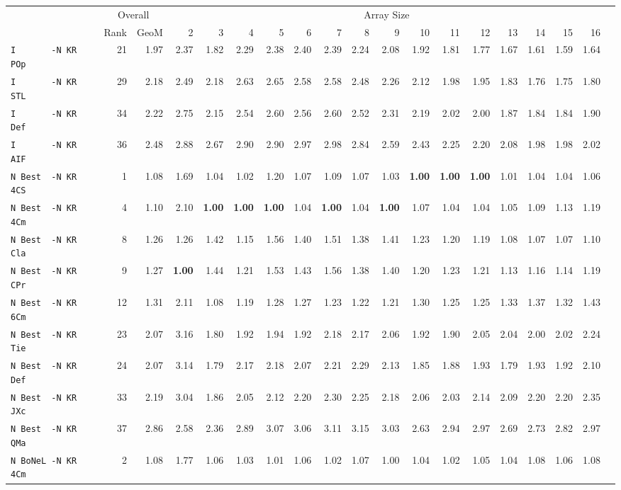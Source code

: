 \begin{tabular}{l | r @{~~} r | r@{~~}r@{~~}r@{~~}r@{~~}r@{~~}r@{~~}r@{~~}r@{~~}r@{~~}r@{~~}r@{~~}r@{~~}r@{~~}r@{~~}r@{~~}r|}
 & \multicolumn{2}{c|}{Overall} & \multicolumn{15}{c}{Array Size} \\
 & Rank & GeoM & 2&3&4&5&6&7&8&9&10&11&12&13&14&15&16\\ \hline
\verb+I       -N KR POp+ & 21 & 1.97 & 2.37&1.82&2.29&2.38&2.40&2.39&2.24&2.08&1.92&1.81&1.77&1.67&1.61&1.59&1.64\\
\verb+I       -N KR STL+ & 29 & 2.18 & 2.49&2.18&2.63&2.65&2.58&2.58&2.48&2.26&2.12&1.98&1.95&1.83&1.76&1.75&1.80\\
\verb+I       -N KR Def+ & 34 & 2.22 & 2.75&2.15&2.54&2.60&2.56&2.60&2.52&2.31&2.19&2.02&2.00&1.87&1.84&1.84&1.90\\
\verb+I       -N KR AIF+ & 36 & 2.48 & 2.88&2.67&2.90&2.90&2.97&2.98&2.84&2.59&2.43&2.25&2.20&2.08&1.98&1.98&2.02\smallskip \\
\verb+N Best  -N KR 4CS+ & 1 & 1.08 & 1.69&1.04&1.02&1.20&1.07&1.09&1.07&1.03&\textbf{1.00}&\textbf{1.00}&\textbf{1.00}&1.01&1.04&1.04&1.06\\
\verb+N Best  -N KR 4Cm+ & 4 & 1.10 & 2.10&\textbf{1.00}&\textbf{1.00}&\textbf{1.00}&1.04&\textbf{1.00}&1.04&\textbf{1.00}&1.07&1.04&1.04&1.05&1.09&1.13&1.19\\
\verb+N Best  -N KR Cla+ & 8 & 1.26 & 1.26&1.42&1.15&1.56&1.40&1.51&1.38&1.41&1.23&1.20&1.19&1.08&1.07&1.07&1.10\\
\verb+N Best  -N KR CPr+ & 9 & 1.27 & \textbf{1.00}&1.44&1.21&1.53&1.43&1.56&1.38&1.40&1.20&1.23&1.21&1.13&1.16&1.14&1.19\\
\verb+N Best  -N KR 6Cm+ & 12 & 1.31 & 2.11&1.08&1.19&1.28&1.27&1.23&1.22&1.21&1.30&1.25&1.25&1.33&1.37&1.32&1.43\\
\verb+N Best  -N KR Tie+ & 23 & 2.07 & 3.16&1.80&1.92&1.94&1.92&2.18&2.17&2.06&1.92&1.90&2.05&2.04&2.00&2.02&2.24\\
\verb+N Best  -N KR Def+ & 24 & 2.07 & 3.14&1.79&2.17&2.18&2.07&2.21&2.29&2.13&1.85&1.88&1.93&1.79&1.93&1.92&2.10\\
\verb+N Best  -N KR JXc+ & 33 & 2.19 & 3.04&1.86&2.05&2.12&2.20&2.30&2.25&2.18&2.06&2.03&2.14&2.09&2.20&2.20&2.35\\
\verb+N Best  -N KR QMa+ & 37 & 2.86 & 2.58&2.36&2.89&3.07&3.06&3.11&3.15&3.03&2.63&2.94&2.97&2.69&2.73&2.82&2.97\smallskip \\
\verb+N BoNeL -N KR 4Cm+ & 2 & 1.08 & 1.77&1.06&1.03&1.01&1.06&1.02&1.07&1.00&1.04&1.02&1.05&1.04&1.08&1.06&1.08\\

\end{tabular}
